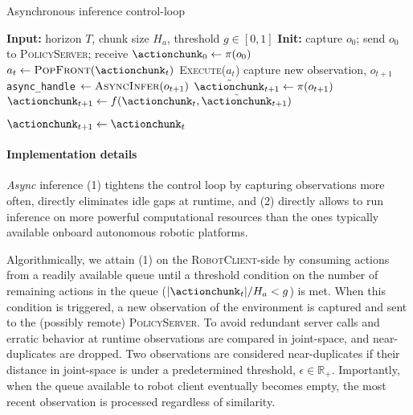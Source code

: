 \begin{algorithm}
  \caption{Asynchronous inference control-loop}
  \label{alg:robotclient}
  \begin{algorithmic}[1]
    \State \textbf{Input:} horizon \( T \), chunk size \( H_a \), threshold \( g\in[0,1] \)
    \State \textbf{Init:} capture \( o_0 \); send \( o_0 \) to \textsc{PolicyServer};
           receive \( \actionchunk_0 \gets \pi(o_0) \)
        \State \( a_t \gets \textsc{PopFront}(\actionchunk_t) \)
        \State \textsc{Execute}(\( a_t \)) 
         
            \State capture new observation, \( o_{t+1} \)
             
                \State \texttt{async\_handle} \( \gets \textsc{AsyncInfer}(o_{t+1})\) 
                \State \( \tilde{\actionchunk}_{t+1} \gets \pi(o_{t+1}) \) 
                \State \( \actionchunk_{t+1} \gets f(\actionchunk_t,\tilde{\actionchunk}_{t+1}) \) 
                
            \EndIf
        \EndIf
            \State \( \actionchunk_{t+1} \gets \actionchunk_t \) 
        \EndIf
    \EndFor
  \end{algorithmic}
  \label{alg:async-inference}
\end{algorithm}


\paragraph{Implementation details}

\textit{Async} inference (1) tightens the control loop by capturing observations more often, directly eliminates idle gaps at runtime, and (2) directly allows to run inference on more powerful computational resources than the ones typically available onboard autonomous robotic platforms.

Algorithmically, we attain (1) on the \textsc{RobotClient}-side by consuming actions from a readily available queue until a threshold condition on the number of remaining actions in the queue (\(\vert \actionchunk_t \vert / H_a < g \)) is met. When this condition is triggered, a new observation of the environment is captured and sent to the (possibly remote) \textsc{PolicyServer}. 
To avoid redundant server calls and erratic behavior at runtime observations are compared in joint-space, and near-duplicates are dropped.
Two observations are considered near-duplicates if their distance in joint-space is under a predetermined threshold, \( \epsilon \in \mathbb R_+\).
Importantly, when the queue available to robot client eventually becomes empty, the most recent observation is processed regardless of similarity.

